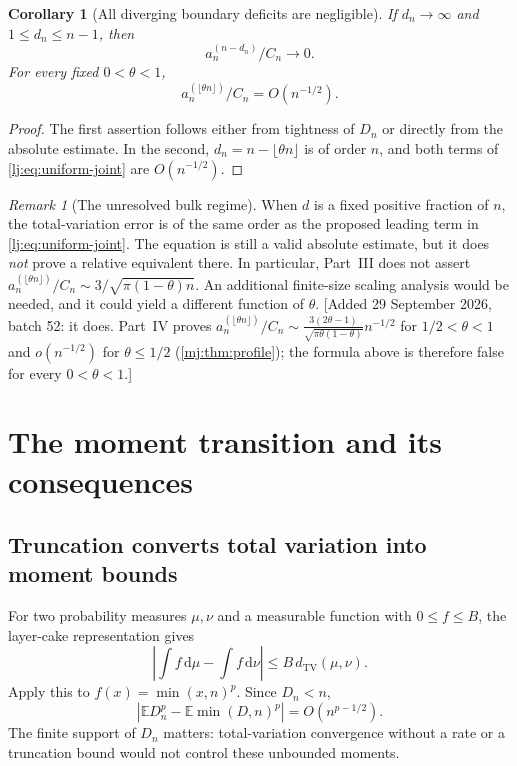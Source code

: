 \documentclass[11pt,a4paper]{article}
\newtheorem{corollary}[corollary]{Corollary}
\theoremstyle{definition}\newaliascnt{definition}{theorem}
\theoremstyle{remark}\newaliascnt{remark}{theorem}
\newtheorem{remark}[remark]{Remark}
\newcommand{\dd}{\mathrm d}
\newcommand{\ljE}{\mathbb E}
\newcommand{\ljTV}{d_{\mathrm{TV}}}
\begin{document}
\begin{corollary}[All diverging boundary deficits are negligible]
\label{lj:cor:diverging}
If $d_n\to\infty$ and $1\le d_n\le n-1$, then
\[
 a_n^{(n-d_n)}/C_n\longrightarrow0.
\]
For every fixed $0<\theta<1$,
\[
 a_n^{(\lfloor\theta n\rfloor)}/C_n=O(n^{-1/2}).
\]
\end{corollary}
\begin{proof}
The first assertion follows either from tightness of $D_n$ or directly
from the absolute estimate. In the second, $d_n=n-\lfloor\theta n\rfloor$
is of order $n$, and both terms of \eqref{lj:eq:uniform-joint} are
$O(n^{-1/2})$.
\end{proof}

\begin{remark}[The unresolved bulk regime]\label{lj:rem:bulk}
When $d$ is a fixed positive fraction of $n$, the total-variation error
is of the same order as the proposed leading term in
\eqref{lj:eq:uniform-joint}. The equation is still a valid absolute estimate,
but it does \emph{not} prove a relative equivalent there. In particular,
Part~III does not assert
$a_n^{(\lfloor\theta n\rfloor)}/C_n\sim
3/\sqrt{\pi(1-\theta)n}$. An additional finite-size scaling analysis would
be needed, and it could yield a different function of $\theta$.
[Added 29 September 2026, batch 52: it does. Part~IV proves
$a_n^{(\lfloor\theta n\rfloor)}/C_n\sim\frac{3(2\theta-1)}
{\sqrt{\pi\theta(1-\theta)}}n^{-1/2}$ for $1/2<\theta<1$ and $o(n^{-1/2})$
for $\theta\le1/2$ (\cref{mj:thm:profile}); the formula above is therefore
false for every $0<\theta<1$.]
\end{remark}

\section{The moment transition and its consequences}
\label{lj:sec:moments}

\subsection{Truncation converts total variation into moment bounds}
For two probability measures $\mu,\nu$ and a measurable function with
$0\le f\le B$, the layer-cake representation gives
\begin{equation}
 \left|\int f\,\dd\mu-\int f\,\dd\nu\right|
 \le B\,\ljTV(\mu,\nu).
 \label{lj:eq:bounded-test}
\end{equation}
Apply this to $f(x)=\min(x,n)^p$. Since $D_n<n$,
\begin{equation}
 \left|\ljE D_n^p-\ljE\min(D,n)^p\right|
 =O(n^{p-1/2}).
 \label{lj:eq:moment-comparison}
\end{equation}
The finite support of $D_n$ matters: total-variation convergence without
a rate or a truncation bound would not control these unbounded moments.
\end{document}
